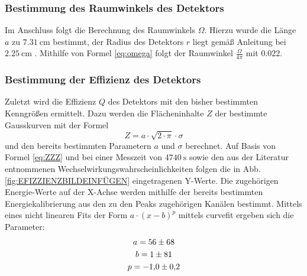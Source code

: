 \subsubsection{Bestimmung des Raumwinkels des Detektors}
Im Anschluss folgt die Berechnung des Raumwinkels $\Omega$. Hierzu wurde die Länge $a$ zu $\SI{7.31}{\centi\meter}$ bestimmt, der Radius des Detektors $r$ liegt gemäß Anleitung bei $\SI{2.25}{\centi\meter}$ \cite{V18}. Mithilfe von Formel \eqref{eq:omega} folgt der Raumwinkel $\frac{\Omega}{4 \pi}$ mit $0.022$.
\subsubsection{Bestimmung der Effizienz des Detektors}
Zuletzt wird die Effizienz $Q$ des Detektors mit den bisher bestimmten Kenngrößen ermittelt. Dazu werden die Flächeninhalte $Z$ der bestimmte Gausskurven mit der Formel 
\begin{equation}
    Z = a \cdot \sqrt{2 \cdot \pi} \cdot \sigma \label{eq:flach}
\end{equation}
und den bereits bestimmten Parametern $a$ und $\sigma$ berechnet. Auf Basis von Formel \eqref{eq:ZZZ} und bei einer Messzeit von $\SI{4740}{\second}$ sowie den aus der Literatur entnommenen Wechselwirkungswahrscheinlichkeiten\cite{Eu152} folgen die in Abb. \ref{fig:EFIZZIENZBILDEINFÜGEN} eingetragenen Y-Werte. Die zugehörigen Energie-Werte auf der X-Achse werden mithilfe der bereits bestimmten Energiekalibrierung aus den zu den Peaks zugehörigen Kanälen bestimmt. Mittels eines nicht linearen Fits der Form $a \cdot (x-b)^p$ mittels curvefit \cite{scipy} ergeben sich die Parameter:
\begin{gather*}
    a = \num{56 \pm 68}\\
    b = \num{1\pm 81}\\
    p = \num{-1.0 \pm 0.2}
\end{gather*}

